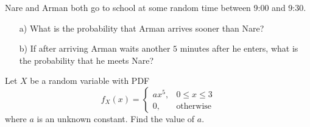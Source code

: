 \bigskip
\begin{problem}[1 point]
    Nare and Arman both go to school at some random time between 9:00 and 9:30.
    
    \begin{enumerate}
        \item[a) ] What is the probability that Arman arrives sooner than Nare?
        
        \item[b) ] If after arriving Arman waits another $5$ minutes after he enters, what is the probability that he meets Nare?
        
    \end{enumerate} 
\end{problem}
\bigskip
\begin{problem}
    Let $X$ be a random variable with PDF
    \[
    f_X(x) = \begin{cases}
        ax^5,& 0\le x \le 3 \\
        0,& \text{otherwise}
    \end{cases}
    \]
where $a$ is an unknown constant. Find the value of $a$.
\end{problem}

